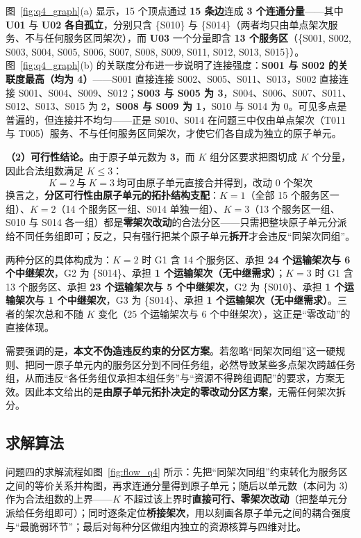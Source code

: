 图~\ref{fig:q4_graph}(a) 显示，15 个顶点通过 \textbf{15 条边}连成 \textbf{3 个连通分量}——其中 \textbf{U01} 与 \textbf{U02} \textbf{各自孤立}，分别只含 \{S010\} 与 \{S014\}（两者均只由单点架次服务、不与任何服务区同架次），而 \textbf{U03} 一个分量即含 \textbf{13 个服务区}（\{S001, S002, S003, S004, S005, S006, S007, S008, S009, S011, S012, S013, S015\}）。图~\ref{fig:q4_graph}(b) 的关联度分布进一步说明了连接强度：\textbf{S001 与 S002 的关联度最高（均为 4）}——S001 直接连接 S002、S005、S011、S013，S002 直接连接 S001、S004、S009、S012；\textbf{S003 与 S005 为 3}，S004、S006、S007、S011、S012、S013、S015 为 2，\textbf{S008 与 S009 为 1}，S010 与 S014 为 0。可见多点是普遍的，但连接并不均匀——正是 S010、S014 在问题三中仅由单点架次（T011 与 T005）服务、不与任何服务区同架次，才使它们各自成为独立的原子单元。

\textbf{（2）可行性结论。}由于原子单元数为 \textbf{3}，而 $K$ 组分区要求把图切成 $K$ 个分量，因此合法组数满足 $K\le3$：
\begin{equation}
	\label{eq:29}
	\boxed{\ K=2\ \text{与}\ K=3\ \text{均可由原子单元直接合并得到，改动 0 个架次}\ }
\end{equation}
换言之，\textbf{分区可行性由原子单元的拓扑结构支配}：$K=1$（全部 15 个服务区一组）、$K=2$（14 个服务区一组、S014 单独一组）、$K=3$（13 个服务区一组、S010 与 S014 各一组）都是\textbf{零架次改动}的合法分区——只需把整块原子单元分派给不同任务组即可；反之，只有强行把某个原子单元\textbf{拆开}才会违反“同架次同组”。

两种分区的具体构成为：$K=2$ 时 G1 含 14 个服务区、承担 \textbf{24 个运输架次与 6 个中继架次}，G2 为 \{S014\}、承担 \textbf{1 个运输架次（无中继需求）}；$K=3$ 时 G1 含 13 个服务区、承担 \textbf{23 个运输架次与 5 个中继架次}，G2 为 \{S010\}、承担 \textbf{1 个运输架次与 1 个中继架次}，G3 为 \{S014\}、承担 \textbf{1 个运输架次（无中继需求）}。三者的架次总和不随 $K$ 变化（$25$ 个运输架次与 $6$ 个中继架次），这正是“零改动”的直接体现。

需要强调的是，\textbf{本文不伪造违反约束的分区方案}。若忽略“同架次同组”这一硬规则、把同一原子单元内的服务区分到不同任务组，必然导致某些多点架次跨越任务组，从而违反“各任务组仅承担本组任务”与“资源不得跨组调配”的要求，方案无效。因此本文给出的是\textbf{由原子单元拓扑决定的零改动分区方案}，无需任何架次拆分。

\subsection{求解算法}

问题四的求解流程如图~\ref{fig:flow_q4} 所示：先把“同架次同组”约束转化为服务区之间的等价关系并构图，再求连通分量得到原子单元；随后以单元数（本问为 3）作为合法组数的上界——$K$ 不超过该上界时\textbf{直接可行、零架次改动}（把整单元分派给任务组即可）；同时逐条定位\textbf{桥接架次}，用以刻画各原子单元之间的耦合强度与“最脆弱环节”；最后对每种分区做组内独立的资源核算与四维对比。

